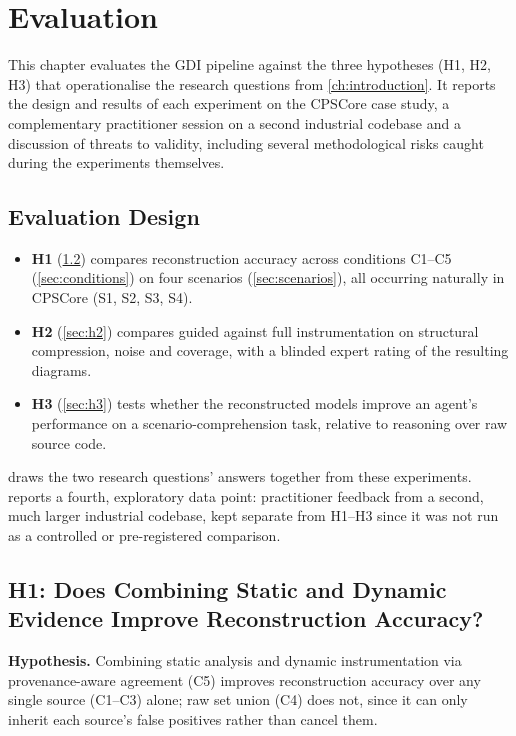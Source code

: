 \chapter{Evaluation}\label{ch:analysis}

This chapter evaluates the \ac{GDI} pipeline against the three hypotheses
(H1, H2, H3) that operationalise the research questions from
\cref{ch:introduction}. It reports the design and results of each
experiment on the CPSCore case study, a complementary practitioner
session on a second industrial codebase and a discussion of threats to
validity, including several methodological risks caught during the
experiments themselves.

\section{Evaluation Design}\label{sec:eval-design}

\begin{itemize}
  \item \textbf{H1} (\cref{sec:h1}) compares reconstruction accuracy
    across conditions C1--C5 (\cref{sec:conditions}) on four scenarios
    (\cref{sec:scenarios}), all occurring naturally in CPSCore (S1, S2,
    S3, S4).
  \item \textbf{H2} (\cref{sec:h2}) compares guided against full
    instrumentation on structural compression, noise and coverage, with a
    blinded expert rating of the resulting diagrams.
  \item \textbf{H3} (\cref{sec:h3}) tests whether the reconstructed models
    improve an agent's performance on a scenario-comprehension task,
    relative to reasoning over raw source code.
\end{itemize}

 draws the two research questions' answers together
from these experiments.
 reports a fourth, exploratory data point:
practitioner feedback from a second, much larger industrial codebase,
kept separate from H1--H3 since it was not run as a controlled or
pre-registered comparison.

\section{H1: Does Combining Static and Dynamic Evidence Improve Reconstruction Accuracy?}\label{sec:h1}

\textbf{Hypothesis.} Combining static analysis and dynamic instrumentation
via provenance-aware agreement (C5) improves reconstruction accuracy over
any single source (C1--C3) alone; raw set union (C4) does not, since it
can only inherit each source's false positives rather than cancel them.

